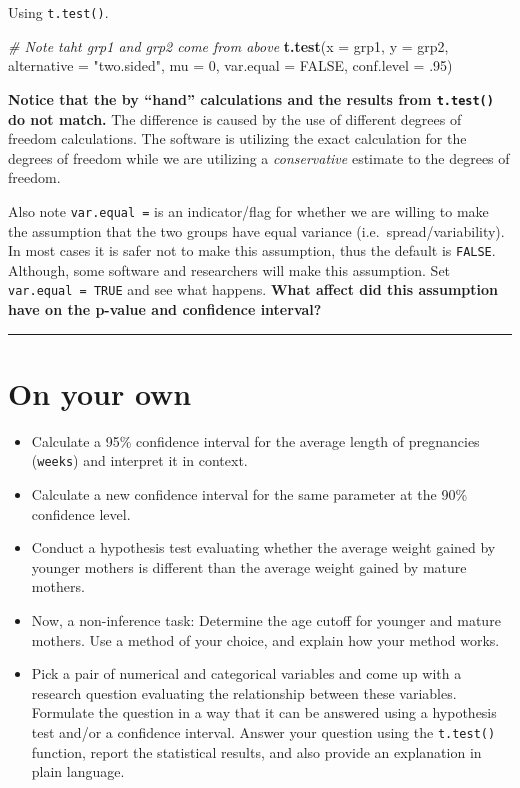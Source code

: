\documentclass[]{book}
\newenvironment{Shaded}{\begin{snugshade}}{\end{snugshade}}
\newcommand{\KeywordTok}[1]{\textcolor[rgb]{0.13,0.29,0.53}{\textbf{#1}}}
\newcommand{\DataTypeTok}[1]{\textcolor[rgb]{0.13,0.29,0.53}{#1}}
\newcommand{\DecValTok}[1]{\textcolor[rgb]{0.00,0.00,0.81}{#1}}
\newcommand{\StringTok}[1]{\textcolor[rgb]{0.31,0.60,0.02}{#1}}
\newcommand{\CommentTok}[1]{\textcolor[rgb]{0.56,0.35,0.01}{\textit{#1}}}
\newcommand{\OtherTok}[1]{\textcolor[rgb]{0.56,0.35,0.01}{#1}}
\newcommand{\NormalTok}[1]{#1}
\theoremstyle{definition}
\theoremstyle{definition}
\theoremstyle{definition}
\theoremstyle{remark}
\begin{document}
Using \texttt{t.test()}.

\begin{Shaded}
\begin{Highlighting}[]
\CommentTok{# Note taht grp1 and grp2 come from above}
\KeywordTok{t.test}\NormalTok{(}\DataTypeTok{x =}\NormalTok{ grp1, }\DataTypeTok{y =}\NormalTok{ grp2, }\DataTypeTok{alternative =} \StringTok{"two.sided"}\NormalTok{, }\DataTypeTok{mu =} \DecValTok{0}\NormalTok{, }\DataTypeTok{var.equal =} \OtherTok{FALSE}\NormalTok{, }\DataTypeTok{conf.level =}\NormalTok{ .}\DecValTok{95}\NormalTok{)}
\end{Highlighting}
\end{Shaded}

\textbf{Notice that the by ``hand'' calculations and the results from
\texttt{t.test()} do not match.} The difference is caused by the use of
different degrees of freedom calculations. The software is utilizing the
exact calculation for the degrees of freedom while we are utilizing a
\emph{conservative} estimate to the degrees of freedom.

Also note \texttt{var.equal\ =} is an indicator/flag for whether we are
willing to make the assumption that the two groups have equal variance
(i.e.~spread/variability). In most cases it is safer not to make this
assumption, thus the default is \texttt{FALSE}. Although, some software
and researchers will make this assumption. Set
\texttt{var.equal\ =\ TRUE} and see what happens. \textbf{What affect
did this assumption have on the p-value and confidence interval?}

\begin{center}\rule{0.5\linewidth}{\linethickness}\end{center}

\section{On your own}\label{on-your-own-5}

\begin{itemize}
\item
  Calculate a 95\% confidence interval for the average length of
  pregnancies (\texttt{weeks}) and interpret it in context.
\item
  Calculate a new confidence interval for the same parameter at the 90\%
  confidence level.
\item
  Conduct a hypothesis test evaluating whether the average weight gained
  by younger mothers is different than the average weight gained by
  mature mothers.
\item
  Now, a non-inference task: Determine the age cutoff for younger and
  mature mothers. Use a method of your choice, and explain how your
  method works.
\item
  Pick a pair of numerical and categorical variables and come up with a
  research question evaluating the relationship between these variables.
  Formulate the question in a way that it can be answered using a
  hypothesis test and/or a confidence interval. Answer your question
  using the \texttt{t.test()} function, report the statistical results,
  and also provide an explanation in plain language.
\end{itemize}
\end{document}
